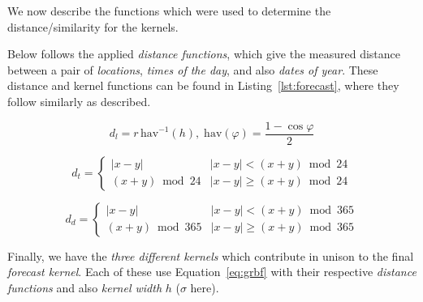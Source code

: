 \documentclass[a4paper, 12pt]{article}
\begin{document}
    We now describe the functions which were used to determine the distance/similarity for the kernels.

    Below follows the applied \emph{distance functions}, which give the measured distance between a pair of \emph{locations}, \emph{times of the day}, and also \emph{dates of year}. These distance and kernel functions can be found in Listing~\ref{lst:forecast}, where they follow similarly as described.

    \begin{equation*} \label{eq:location}
    d_l = r\, \mathrm{hav}^{-1}(h),\; \mathrm{hav}(\varphi) = \frac{1 - \cos\varphi}{2}
    \end{equation*}
    
    
    
    \begin{equation*} \label{eq:time}
    d_t = \begin{cases}
    |x - y| & |x - y| < (x + y) \bmod 24\\
    (x + y) \bmod 24 & |x - y| \geq (x + y) \bmod 24
    \end{cases}
    \end{equation*}

   

    \begin{equation*} \label{eq:day}
    d_d = \begin{cases}
    |x - y| & |x - y| < (x + y) \bmod 365\\
    (x + y) \bmod 365 & |x - y| \geq (x + y) \bmod 365
    \end{cases}
    \end{equation*}

   
    

    Finally, we have the \emph{three different kernels} which contribute in unison to the final \emph{forecast kernel}. Each of these use Equation~\ref{eq:grbf} with their respective \emph{distance functions} and also \emph{kernel width} \(h\) (\(\sigma\) here).
\end{document}
